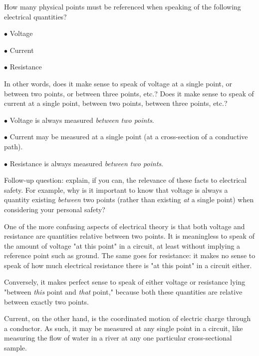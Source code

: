 

How many physical points must be referenced when speaking of the following electrical quantities?

\vskip 10pt

\item{$\bullet$} Voltage
\item{$\bullet$} Current
\item{$\bullet$} Resistance

\vskip 10pt

In other words, does it make sense to speak of voltage at a single point, or between two points, or between three points, etc.?  Does it make sense to speak of current at a single point, between two points, between three points, etc.?







\item{$\bullet$} Voltage is always measured {\it between two points}.
\item{$\bullet$} Current may be measured at a single point (at a cross-section of a conductive path).
\item{$\bullet$} Resistance is always measured {\it between two points}.

\vskip 10pt

Follow-up question: explain, if you can, the relevance of these facts to electrical safety.  For example, why is it important to know that voltage is always a quantity existing {\it between} two points (rather than existing {\it at} a single point) when considering your personal safety?







One of the more confusing aspects of electrical theory is that both voltage and resistance are quantities relative between two points.  It is meaningless to speak of the amount of voltage "at this point" in a circuit, at least without implying a reference point such as ground.  The same goes for resistance: it makes no sense to speak of how much electrical resistance there is "at this point" in a circuit either.

Conversely, it makes perfect sense to speak of either voltage or resistance lying "between {\it this} point and {\it that} point," because both these quantities are relative between exactly two points.

Current, on the other hand, is the coordinated motion of electric charge through a conductor.  As such, it may be measured at any single point in a circuit, like measuring the flow of water in a river at any one particular cross-sectional sample.




